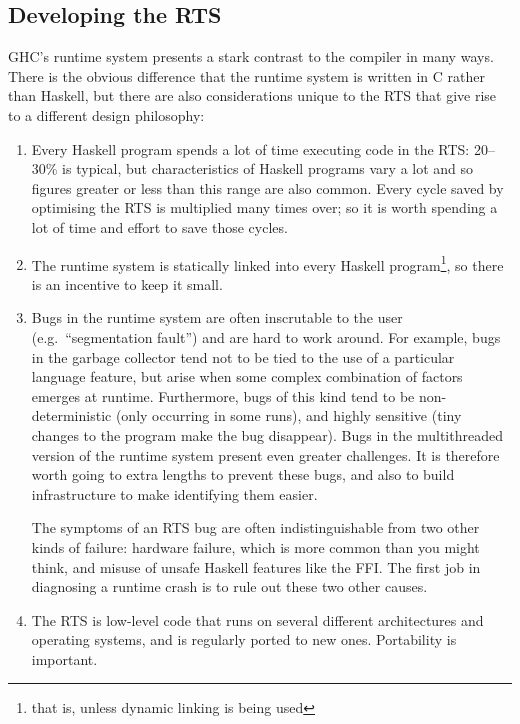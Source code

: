 \documentclass{article}
\begin{document}
{\subsection{Developing the RTS}

GHC's runtime system presents a stark contrast to
the compiler in many ways.  There is the obvious difference that the
runtime system is written in C rather than Haskell, but there are also
considerations unique to the RTS that give rise to a different design
philosophy:

\begin{enumerate}
\item Every Haskell program spends a lot of time executing code in the
  RTS: 20--30\% is typical, but characteristics of Haskell
  programs vary a lot and so figures greater or less than this range
  are also common.  Every cycle saved by optimising the RTS is
  multiplied many times over; so it is worth spending a lot of time
  and effort to save those cycles.

\item The runtime system is statically linked into every Haskell
  program\footnote{that is, unless dynamic linking is being used}, so
  there is an incentive to keep it small.

\item Bugs in the runtime system are often inscrutable to the user
  (e.g.\ ``segmentation fault'') and are hard to work around.  For
  example, bugs in the garbage collector tend not to be tied to the
  use of a particular language feature, but arise when some complex
  combination of factors emerges at runtime.  Furthermore, bugs of
  this kind tend to be non-deterministic (only occurring in some
  runs), and highly sensitive (tiny changes to the program make the
  bug disappear).  Bugs in the multithreaded version of the runtime
  system present even greater challenges.  It is therefore worth going
  to extra lengths to prevent these bugs, and also to build
  infrastructure to make identifying them easier.

  The symptoms of an RTS bug are often indistinguishable from two
  other kinds of failure: hardware failure, which is more common than
  you might think, and misuse of unsafe Haskell features like the FFI.
  The first job in diagnosing a runtime crash is to rule out these two
  other causes.

\item The RTS is low-level code that runs on several different
  architectures and operating systems, and is regularly ported to
  new ones.  Portability is important.
\end{enumerate}

}
\end{document}
